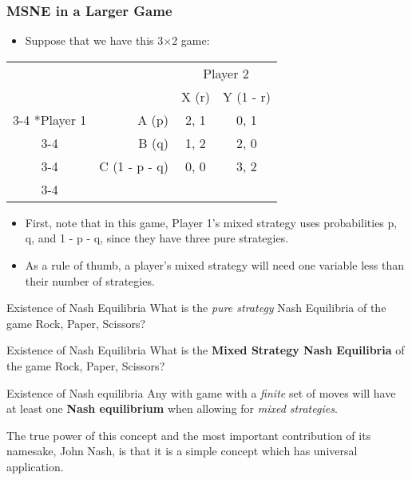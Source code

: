 \begin{frame}
\frametitle{MSNE in a Larger Game}
\begin{itemize}
	\item Suppose that we have this 3$\times$2 game:
\end{itemize}
\begin{table}[h]
\centering
\begin{tabular}{cr|c|c|}
	& \multicolumn{1}{c}{} & \multicolumn{2}{c}{Player 2}\\
	& \multicolumn{1}{c}{} & \multicolumn{1}{c}{X (r)}  & \multicolumn{1}{c}{Y (1 - r)} \\\cline{3-4}
	\multirow{3}*{Player 1}  & A (p) & 2, 1 & 0, 1 \\\cline{3-4}
	& B (q) & 1, 2 & 2, 0 \\\cline{3-4}
	& C (1 - p - q) & 0, 0 & 3, 2 \\\cline{3-4}
\end{tabular}
\end{table}
\begin{itemize}
	\item First, note that in this game, Player 1's mixed strategy uses probabilities p, q, and 1 - p - q, since they have three pure strategies.
	\item As a rule of thumb, a player's mixed strategy will need one variable less than their number of strategies.
\end{itemize}
\end{frame}

\begin{frame}{Existence of Nash Equilibria}
  What is the \textit{pure strategy} Nash Equilibria of the game
  \alert{Rock, Paper, Scissors}?
\end{frame}

\begin{frame}{Existence of Nash Equilibria}
  What is the \textbf{Mixed Strategy Nash Equilibria} of the game
  \alert{Rock, Paper, Scissors}?
\end{frame}

\begin{frame}{Existence of Nash equilibria}
  Any with game with a \textit{finite} set of moves
  will have at least one \textbf{Nash equilibrium}
  when allowing for \textit{mixed strategies}.

  The true power of this concept and the most important 
  contribution of its namesake, John Nash,
  is that it is a simple concept which has universal application.
\end{frame}


